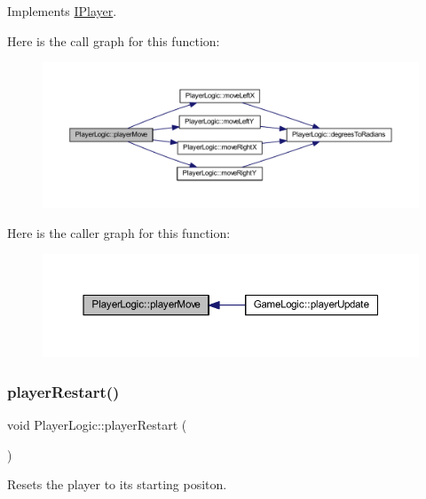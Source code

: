 Implements \hyperlink{class_i_player_a39685438043898f69bcf62c81b60e7b9}{I\+Player}.

Here is the call graph for this function\+:
\nopagebreak
\begin{figure}[H]
\begin{center}
\leavevmode
\includegraphics[width=350pt]{class_player_logic_a2b63d2c01e898e5798c2801466c8b432_cgraph}
\end{center}
\end{figure}
Here is the caller graph for this function\+:
\nopagebreak
\begin{figure}[H]
\begin{center}
\leavevmode
\includegraphics[width=350pt]{class_player_logic_a2b63d2c01e898e5798c2801466c8b432_icgraph}
\end{center}
\end{figure}
\mbox{\label{class_player_logic_aaaf0e8356e5af9753015960be7727724}} 
\subsubsection{\texorpdfstring{player\+Restart()}{playerRestart()}}
{\footnotesize\ttfamily void Player\+Logic\+::player\+Restart (\begin{DoxyParamCaption}{ }\end{DoxyParamCaption})}



Resets the player to its starting positon. 

